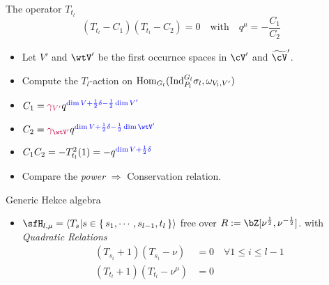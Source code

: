 \documentclass[t,mathserif,11pt,usenames,dvipsnames]{beamer}
\theoremstyle{plain}
\theoremstyle{definition}
\def\Hom{{\rm Hom}}
\def\Ind{{\rm Ind}}
\def\Hom{{\mathrm{Hom}}}
\def\half{{\frac{1}{2}}}
\def\blue{\color{blue}}
\let\oldemph\emph
\def\emph#1{\oldemph{\blue #1}}
\begin{document}
\begin{frame}{The operator $T_{t_{l}}$}
  \[
    (T_{t_{l}} - C_1)(T_{t_{l}} - C_2) = 0 \quad \text{with}\quad q^{\mu} = -\frac{C_{1}}{C_{2}}
  \]
  \begin{itemize}[<+->]
    \item Let $V'$ and $\wtV'$ be the first occurnce spaces in $\cV'$ and
    $\wtcV'$.
    \item Compute the $T_{l}$-action on
          $\Hom_{G_{l}}(\Ind_{P_{l}}^{G_{l}}\sigma_{l}, \omega_{V_{l},V'})$
    \item[] $C_1 = {\color{purple}\gamma_{V'} } q^{\blue \dim V+\half \delta-\half \dim V'}$
    \item[] $C_2 = {\color{purple}\gamma_{\wtV'}}q^{\blue \dim V+\half \delta-\half \dim \wtV'}$
    \item[] $ C_{1}C_{2} = - T_{t_{l}}^{2}(1) = -q^{\blue \dim V+\half \delta} $ \pause
    \item Compare the \emph{power} $\Rightarrow$ Conservation relation.
  \end{itemize}
\end{frame}


\begin{frame}{Generic Hekce algebra}
  \begin{itemize}
    \item  $\sfH_{l,\mu} = \braket{T_s | s \in \set{s_{1}, \cdots, s_{l-1}, t_{l}}}$
          free over $R:=\bZ[\nu^{\half},\nu^{-\half}]$.
    with \emph{Quadratic Relations}
           \[
          \begin{split}
            (T_{s_{i}} +1 )(T_{s_{i}} -  \nu) &= 0 \quad \forall 1\leq i \leq l-1\\
            (T_{t_{l}} + 1)(T_{t_{l}} -  \nu^{\mu}) &= 0
          \end{split} \]
  \end{itemize}
\end{frame}
\end{document}
